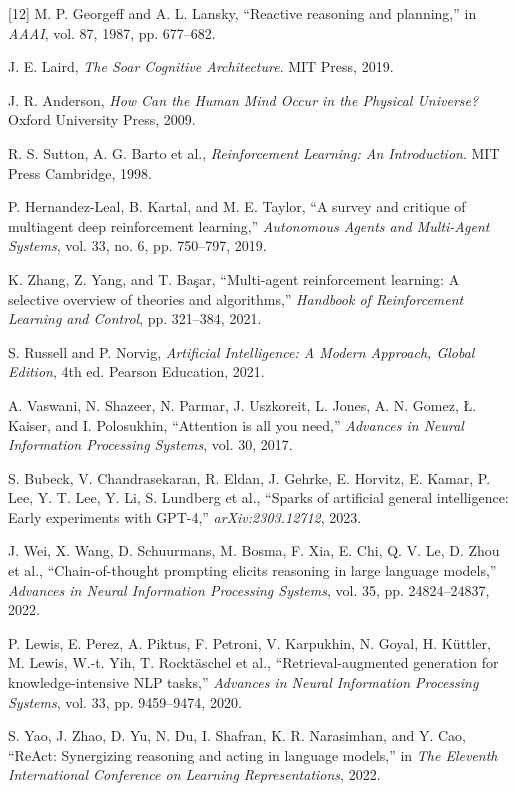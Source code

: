 {[12] M. P. Georgeff and A. L. Lansky, ``Reactive reasoning and planning,'' in \textit{AAAI}, vol. 87, 1987, pp. 677--682.\par\smallskip
[13] J. E. Laird, \textit{The Soar Cognitive Architecture}. MIT Press, 2019.\par\smallskip
[14] J. R. Anderson, \textit{How Can the Human Mind Occur in the Physical Universe?} Oxford University Press, 2009.\par\smallskip
[15] R. S. Sutton, A. G. Barto et al., \textit{Reinforcement Learning: An Introduction}. MIT Press Cambridge, 1998.\par\smallskip
[16] P. Hernandez-Leal, B. Kartal, and M. E. Taylor, ``A survey and critique of multiagent deep reinforcement learning,'' \textit{Autonomous Agents and Multi-Agent Systems}, vol. 33, no. 6, pp. 750--797, 2019.\par\smallskip
[17] K. Zhang, Z. Yang, and T. Başar, ``Multi-agent reinforcement learning: A selective overview of theories and algorithms,'' \textit{Handbook of Reinforcement Learning and Control}, pp. 321--384, 2021.\par\smallskip
[18] S. Russell and P. Norvig, \textit{Artificial Intelligence: A Modern Approach, Global Edition}, 4th ed. Pearson Education, 2021.\par\smallskip
[19] A. Vaswani, N. Shazeer, N. Parmar, J. Uszkoreit, L. Jones, A. N. Gomez, Ł. Kaiser, and I. Polosukhin, ``Attention is all you need,'' \textit{Advances in Neural Information Processing Systems}, vol. 30, 2017.\par\smallskip
[20] S. Bubeck, V. Chandrasekaran, R. Eldan, J. Gehrke, E. Horvitz, E. Kamar, P. Lee, Y. T. Lee, Y. Li, S. Lundberg et al., ``Sparks of artificial general intelligence: Early experiments with GPT-4,'' \textit{arXiv:2303.12712}, 2023.\par\smallskip
[21] J. Wei, X. Wang, D. Schuurmans, M. Bosma, F. Xia, E. Chi, Q. V. Le, D. Zhou et al., ``Chain-of-thought prompting elicits reasoning in large language models,'' \textit{Advances in Neural Information Processing Systems}, vol. 35, pp. 24824--24837, 2022.\par\smallskip
[22] P. Lewis, E. Perez, A. Piktus, F. Petroni, V. Karpukhin, N. Goyal, H. Küttler, M. Lewis, W.-t. Yih, T. Rocktäschel et al., ``Retrieval-augmented generation for knowledge-intensive NLP tasks,'' \textit{Advances in Neural Information Processing Systems}, vol. 33, pp. 9459--9474, 2020.\par\smallskip
[23] S. Yao, J. Zhao, D. Yu, N. Du, I. Shafran, K. R. Narasimhan, and Y. Cao, ``ReAct: Synergizing reasoning and acting in language models,'' in \textit{The Eleventh International Conference on Learning Representations}, 2022.\par\smallskip
}

